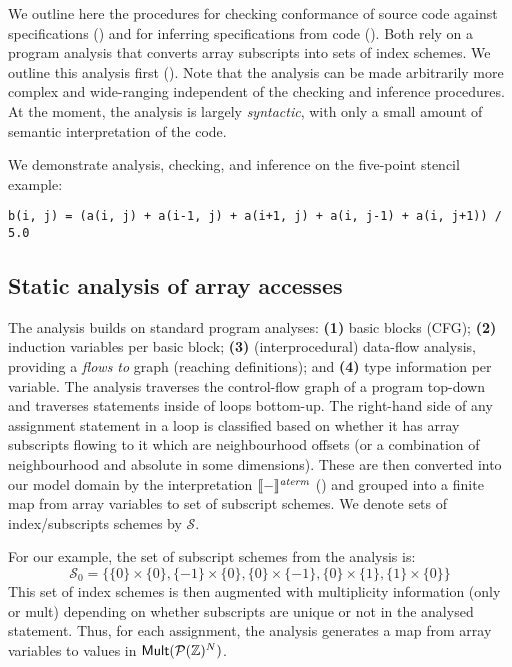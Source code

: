 \noindent
We outline here the procedures for checking conformance
of source code against specifications ()
and for inferring specifications from code ().
Both rely on a program analysis that converts array subscripts
 into sets of index schemes. We outline this analysis
first (). Note that the analysis
can be made arbitrarily more complex and wide-ranging independent
of the checking and inference procedures. At the moment, the analysis
is largely \emph{syntactic}, with only a small amount of
semantic interpretation of the code.

\begin{example}
\label{exm:checking}
We demonstrate analysis, checking, and inference on the
five-point stencil example:
\begin{verbatim}
b(i, j) = (a(i, j) + a(i-1, j) + a(i+1, j) + a(i, j-1) + a(i, j+1)) / 5.0
\end{verbatim}
\end{example}

\subsection{Static analysis of array accesses}
\label{subsec:analysis}

\newcommand{\neigh}{\textsf{neigh}}
\noindent
The analysis builds on standard program analyses:
%
\textbf{(1)} basic blocks (CFG); \textbf{(2)} induction variables per
basic block; \textbf{(3)} (interprocedural) data-flow analysis,
providing a \emph{flows to} graph (reaching definitions); and
\textbf{(4)} type information per variable.  The analysis traverses
the control-flow graph of a program top-down and traverses statements
inside of loops bottom-up. The right-hand side of any assignment
statement in a loop is classified based on whether it has array
subscripts flowing to it which are neighbourhood offsets (or a
combination of neighbourhood and absolute in some dimensions). These
are then converted into our model domain by the interpretation
$\llbracket{} {-} \rrbracket{}^{\mathit{aterm}}$ () and grouped into
a finite map from array variables to set of subscript schemes.  We
denote sets of index/subscripts schemes by $\mathcal{S}$.

For our example, the set of subscript schemes from the analysis is:
%
\begin{equation*}
\mathcal{S}_0 = \{\{0\} \times \{0\}, \{-1\} \times \{0\},
\{0\} \times \{-1\}, \{0\} \times \{1\}, \{1\} \times \{0\}\}
\end{equation*}
%
This set of index schemes is then augmented with multiplicity
information (\textsf{only} or \textsf{mult}) depending on whether
subscripts are unique or not in the analysed statement.
Thus, for each assignment, the analysis generates a map from array
variables to values in $\mathsf{Mult}(\mathcal{P}(\textnormal{$\mathbb{Z}$})^N)$.


